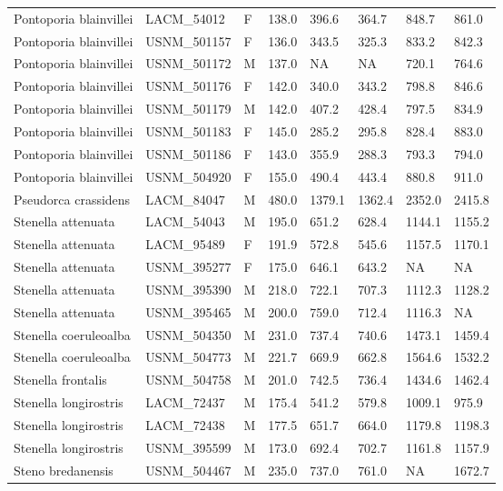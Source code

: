 \begin{longtable}{|p{1.95in}p{1.1in}p{.15in}p{.4in}p{.4in}p{.4in}p{.4in}p{.4in}|}
  Pontoporia blainvillei & LACM\_54012 & F & 138.0 & 396.6 & 364.7 & 848.7 & 861.0 \\ 
  Pontoporia blainvillei & USNM\_501157 & F & 136.0 & 343.5 & 325.3 & 833.2 & 842.3 \\ 
  Pontoporia blainvillei & USNM\_501172 & M & 137.0 & NA & NA & 720.1 & 764.6 \\ 
  Pontoporia blainvillei & USNM\_501176 & F & 142.0 & 340.0 & 343.2 & 798.8 & 846.6 \\ 
  Pontoporia blainvillei & USNM\_501179 & M & 142.0 & 407.2 & 428.4 & 797.5 & 834.9 \\ 
  Pontoporia blainvillei & USNM\_501183 & F & 145.0 & 285.2 & 295.8 & 828.4 & 883.0 \\ 
  Pontoporia blainvillei & USNM\_501186 & F & 143.0 & 355.9 & 288.3 & 793.3 & 794.0 \\ 
  Pontoporia blainvillei & USNM\_504920 & F & 155.0 & 490.4 & 443.4 & 880.8 & 911.0 \\ 
  Pseudorca crassidens & LACM\_84047 & M & 480.0 & 1379.1 & 1362.4 & 2352.0 & 2415.8 \\ 
  Stenella attenuata & LACM\_54043 & M & 195.0 & 651.2 & 628.4 & 1144.1 & 1155.2 \\ 
  Stenella attenuata & LACM\_95489 & F & 191.9 & 572.8 & 545.6 & 1157.5 & 1170.1 \\ 
  Stenella attenuata & USNM\_395277 & F & 175.0 & 646.1 & 643.2 & NA & NA  \\ 
  Stenella attenuata & USNM\_395390 & M & 218.0 & 722.1 & 707.3 & 1112.3 & 1128.2 \\ 
  Stenella attenuata & USNM\_395465 & M & 200.0 & 759.0 & 712.4 & 1116.3 & NA  \\ 
  Stenella coeruleoalba & USNM\_504350 & M & 231.0 & 737.4 & 740.6 & 1473.1 & 1459.4 \\ 
  Stenella coeruleoalba & USNM\_504773 & M & 221.7 & 669.9 & 662.8 & 1564.6 & 1532.2 \\ 
  Stenella frontalis & USNM\_504758 & M & 201.0 & 742.5 & 736.4 & 1434.6 & 1462.4 \\ 
  Stenella longirostris & LACM\_72437 & M & 175.4 & 541.2 & 579.8 & 1009.1 & 975.9 \\ 
  Stenella longirostris & LACM\_72438 & M & 177.5 & 651.7 & 664.0 & 1179.8 & 1198.3 \\ 
  Stenella longirostris & USNM\_395599 & M & 173.0 & 692.4 & 702.7 & 1161.8 & 1157.9 \\ 
  Steno bredanensis & USNM\_504467 & M & 235.0 & 737.0 & 761.0 & NA & 1672.7 \\ 

\end{longtable}
